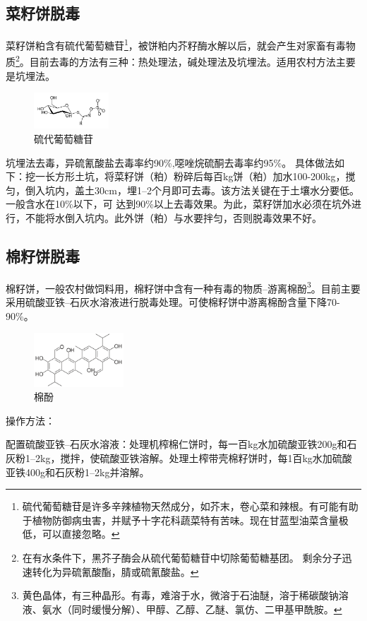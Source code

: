 \documentclass{ctexbook}
\begin{document}
\subsection{菜籽饼脱毒}
菜籽饼粕含有硫代葡萄糖苷\footnote{硫代葡萄糖苷是许多辛辣植物天然成分，如芥末，卷心菜和辣根。有可能有助于植物防御病虫害，并赋予十字花科蔬菜特有苦味。现在甘蓝型油菜含量极低，可以直接忽略。}，被饼粕内芥籽酶水解以后，就会产生对家畜有毒物质\footnote{在有水条件下，黑芥子酶会从硫代葡萄糖苷中切除葡萄糖基团。
剩余分子迅速转化为异硫氰酸酯，腈或硫氰酸盐。}。目前去毒的方法有三种：热处理法，碱处理法及坑埋法。适用农村方法主要是坑埋法。
\begin{figure}[H]
	\centering
	\includegraphics[width=0.25\textwidth]{liugan.png}
	\caption{硫代葡萄糖苷}
\end{figure}

坑埋法去毒，异硫氰酸盐去毒率约90\%,噁唑烷硫酮去毒率约95\%。
具体做法如下：挖一长方形土坑，将菜籽饼（粕）粉碎后每百kg饼（粕）加水100-200kg，搅匀，倒入坑内，盖土30cm，埋1--2个月即可去毒。该方法关键在于土壤水分要低。一般含水在10\%以下，可
达到90\%以上去毒效果。为此，菜籽饼加水必须在坑外进行，不能将水倒入坑内。此外饼（粕）与水要拌匀，否则脱毒效果不好。
\subsection{棉籽饼脱毒}
棉籽饼，一般农村做饲料用，棉籽饼中含有一种有毒的物质--游离棉酚\footnote{黄色晶体，有三种晶形。有毒，难溶于水，微溶于石油醚，溶于稀碳酸钠溶液、氨水（同时缓慢分解）、甲醇、乙醇、乙醚、氯仿、二甲基甲酰胺。}。目前主要采用硫酸亚铁--石灰水溶液进行脱毒处理。可使棉籽饼中游离棉酚含量下降70-90\%。
\begin{figure}[H]
	\centering
	\includegraphics[width=0.3\textwidth]{mianfen.png}
	\caption{棉酚}
\end{figure}

操作方法：

配置硫酸亚铁--石灰水溶液：处理机榨棉仁饼时，每一百kg水加硫酸亚铁200g和石灰粉1--2kg，搅拌，使硫酸亚铁溶解。处理土榨带壳棉籽饼时，每1百kg水加硫酸亚铁400g和石灰粉1--2kg并溶解。
\end{document}

